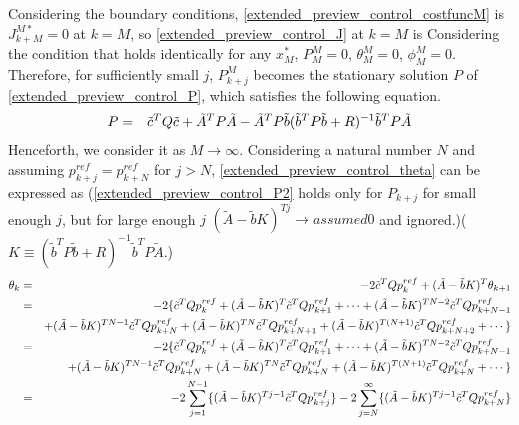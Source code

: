 Considering the boundary conditions, \eqref{extended_preview_control_costfuncM} is $J_{k+M}^{M\ast} = 0$ at $k = M$, so \eqref{extended_preview_control_J} at $k = M$ is Considering the condition that holds identically for any $x_{M}^\ast$, $P_{M}^M = 0$, $\theta_{M}^M = 0$, $\phi_{M }^M = 0$. Therefore, for sufficiently small $j$, $P_{k+j}^M$ becomes the stationary solution $P$ of \eqref{extended_preview_control_P}, which satisfies the following equation.
\begin{eqnarray}
  P &=& \tilde{c}^T Q \tilde{c} + \tilde{A}^T P \tilde{A} - \tilde{A}^T P \tilde{b} (\tilde{b}^T P \tilde{b} + R )^{-1} \tilde{b}^T P \tilde{A} \eqlabel{extended_preview_control_P2}
\end{eqnarray}
Henceforth, we consider it as $M \rightarrow \infty$. Considering a natural number $N$ and assuming $p_{k+j}^{ref} = p_{k+N}^{ref}$ for $j > N$, \eqref{extended_preview_control_theta} can be expressed as (\eqref{extended_preview_control_P2} holds only for $P_{k+j}$ for small enough $j$, but for large enough $j$ $(\tilde{A} - \tilde{b} K)^{T j} \rightarrow assumed 0$ and ignored.)($K \equiv (\tilde{b}^T P \tilde{b} + R )^{-1} \tilde{b}^T P \tilde{A }$.)
\begin{eqnarray}
  \theta_k &=& -2 \tilde{c}^T Q p_k^{ref} + (\tilde{A} - \tilde{b} K)^T \theta_{k+1} \nonumber\\
  &=& -2 \{ \tilde{c}^T Q p_k^{ref} + (\tilde{A} - \tilde{b} K)^T \tilde{c}^T Q p_{k+1}^{ref} + \cdots + (\tilde{A} - \tilde{b} K)^{T N-2} \tilde{c}^T Q p_{k+N-1}^{ref} \nonumber\\
  & & + (\tilde{A} - \tilde{b} K)^{T N-1} \tilde{c}^T Q p_{k+N}^{ref} + (\tilde{A} - \tilde{b} K)^{T N} \tilde{c}^T Q p_{k+N+1}^{ref} + (\tilde{A} - \tilde{b} K)^{T (N+1)} \tilde{c}^T Q p_{k+N+2}^{ref} + \cdots \} \nonumber \\
  &=& -2 \{ \tilde{c}^T Q p_k^{ref} + (\tilde{A} - \tilde{b} K)^T \tilde{c}^T Q p_{k+1}^{ref} + \cdots + (\tilde{A} - \tilde{b} K)^{T N-2} \tilde{c}^T Q p_{k+N-1}^{ref} \nonumber\\
  & & + (\tilde{A} - \tilde{b} K)^{T N-1} \tilde{c}^T Q p_{k+N}^{ref} + (\tilde{A} - \tilde{b} K)^{T N} \tilde{c}^T Q p_{k+N}^{ref} + (\tilde{A} - \tilde{b} K)^{T (N+1)} \tilde{c}^T Q p_{k+N}^{ref} + \cdots \} \nonumber \\
  &=& -2 \sum_{j=1}^{N-1} \{ (\tilde{A} - \tilde{b} K)^{T j-1} \tilde{c}^T Q p_{k+j}^{ref} \} -2 \sum_{j=N}^{\infty} \{ (\tilde{A} - \tilde{b} K)^{T j-1} \tilde{c}^T Q p_{k+N}^{ref} \}\eqlabel{extended_preview_control_theta2}
\end{eqnarray}
